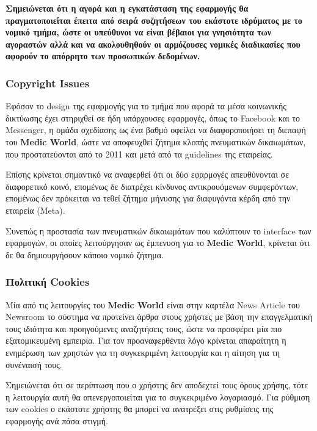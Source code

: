 \documentclass{article}
\begin{document}
\textbf{Σημειώνεται ότι η αγορά και η εγκατάσταση της εφαρμογής θα πραγματοποιείται έπειτα από σειρά συζητήσεων του εκάστοτε ιδρύματος με το νομικό τμήμα, ώστε οι υπεύθυνοι να είναι βέβαιοι για γνησιότητα των αγοραστών αλλά και να ακολουθηθούν οι αρμόζουσες νομικές διαδικασίες που αφορούν το απόρρητο των προσωπικών δεδομένων.}


\subsubsection{Copyright Issues}

Εφόσον το design της εφαρμογής για το τμήμα που αφορά τα μέσα κοινωνικής δικτύωσης έχει στηριχθεί σε ήδη υπάρχουσες εφαρμογές, όπως το Facebook και το Messenger, η ομάδα σχεδίασης ως ένα βαθμό οφείλει να διαφοροποιήσει τη διεπαφή του \textbf{Medic World}, ώστε να αποφευχθεί ζήτημα κλοπής πνευματικών δικαιωμάτων, που προστατεύονται από το 2011 και μετά από τα guidelines της εταιρείας. 
\par Επίσης κρίνεται σημαντικό να αναφερθεί ότι οι δύο εφαρμογές απευθύνονται σε διαφορετικό κοινό, επομένως δε διατρέχει κίνδυνος αντικρουόμενων συμφερόντων, επομένως δεν πρόκειται να τεθεί ζήτημα μήνυσης για διαφυγόντα κέρδη από την εταιρεία (Meta). 
\par Συνεπώς η προστασία των πνευματικών δικαιωμάτων που καλύπτουν το interface των εφαρμογών, οι οποίες λειτούργησαν ως έμπενυση για το \textbf{Medic World}, κρίνεται ότι δε θα δημιουργήσουν κάποιο νομικό ζήτημα.

\subsubsection{Πολιτική Cookies}

Μία από τις λειτουργίες του \textbf{Medic World} είναι στην καρτέλα  News Article του Newsroom το σύστημα να προτείνει άρθρα στους χρήστες με βάση την επαγγελματική τους ιδιότητα και προηγούμενες αναζητήσεις τους, ώστε να προσφέρει μία πιο εξατομικευμένη εμπειρία. Για τον προαναφερθέντα λόγο κρίνεται απαραίτητη η ενημέρωση των χρηστών για τη συγκεκριμένη λειτουργία και η αίτηση για τη συνέναισή τους. 
\par Σημειώνεται ότι σε περίπτωση που ο χρήστης δεν αποδεχτεί τους όρους χρήσης, τότε η λειτουργία αυτή θα απενεργοποιείται για το συγκεκριμένο λογαριασμό. Για ρύθμιση των cookies ο εκάστοτε χρήστης θα μπορεί να ανατρέξει στις ρυθμίσεις της εφαρμογής ανά πάσα στιγμή.
\end{document}

